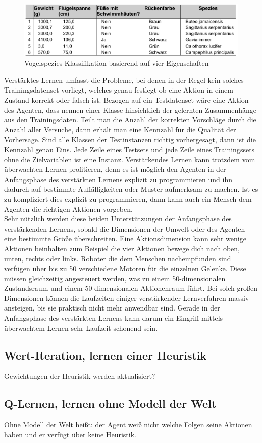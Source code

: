 \begin{figure}[!htbp]
  \centering
  \includegraphics[scale = 0.89]{inhalt/abbildungen/vogel_spezies.pdf}
  \caption{Vogelspezies Klassifikation basierend auf vier Eigenschaften}
  \label{fig:vogel_spezies}
\end{figure} 

Verstärktes Lernen umfasst die Probleme, bei denen in der Regel kein solches Trainingsdatenset vorliegt, welches genau festlegt ob eine Aktion in einem Zustand korrekt oder falsch ist. Bezogen auf ein Testdatenset wäre eine Aktion des Agenten, dass nennen einer Klasse hinsichtlich der gelernten Zusammenhänge aus den Trainingsdaten. Teilt man die Anzahl der korrekten Vorschläge durch die Anzahl aller Versuche, dann erhält man eine Kennzahl für die Qualität der Vorhersage. Sind alle Klassen der Testinstanzen richtig vorhergesagt, dann ist die Kennzahl genau Eins. Jede Zeile eines Testsets und jede Zeile eines Trainingssets ohne die Zielvariablen ist eine Instanz. Verstärkendes Lernen kann trotzdem vom überwachten Lernen profitieren, denn es ist möglich den Agenten in der Anfangsphase des verstärkten Lernens explizit zu programmieren und ihn dadurch auf bestimmte Auffälligkeiten oder Muster aufmerksam zu machen. Ist es zu kompliziert dies explizit zu programmieren, dann kann auch ein Mensch dem Agenten die richtigen Aktionen vorgeben. \\

Sehr nützlich werden diese beiden Unterstützungen der Anfangsphase des verstärkenden Lernens, sobald die Dimensionen der Umwelt oder des Agenten eine bestimmte Größe überschreiten. Eine Aktionsdimension kann sehr wenige Aktionen beinhalten zum Beispiel die vier Aktionen bewege dich nach oben, unten, rechts oder links. Roboter die dem Menschen nachempfunden sind verfügen über bis zu 50 verschiedene Motoren für die einzelnen Gelenke. Diese müssen gleichzeitig angesteuert werden, was zu einem 50-dimensionalen Zustandsraum und einem 50-dimensionalen Aktionenraum führt\cite[\acs{vgl.} 305\psq]{Ertel}. Bei solch großen Dimensionen können die Laufzeiten einiger verstärkender Lernverfahren massiv ansteigen, bis sie praktisch nicht mehr anwendbar sind. Gerade in der Anfangsphase des verstärkten Lernens kann darum ein Eingriff mittels überwachtem Lernen sehr Laufzeit schonend sein.

\subsection{Wert-Iteration, lernen einer Heuristik}
Gewichtungen der Heuristik werden aktualisiert?

\subsection{Q-Lernen, lernen ohne Modell der Welt}
Ohne Modell der Welt heißt: der Agent weiß nicht welche Folgen seine Aktionen haben und er verfügt über keine Heuristik.